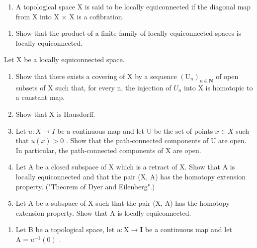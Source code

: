 \begin{enumerate}
\def\labelenumi{\arabic{enumi})}
\setcounter{enumi}{17}
\tightlist
\item
  A topological space X is said to be locally equiconnected if the diagonal map from X into X × X is a cofibration.
\end{enumerate}

\begin{enumerate}
\def\labelenumi{\alph{enumi})}
\tightlist
\item
  Show that the product of a finite family of locally equiconnected spaces is locally equiconnected.
\end{enumerate}

Let X be a locally equiconnected space.

\begin{enumerate}
\def\labelenumi{\alph{enumi})}
\setcounter{enumi}{1}
\item
  Show that there exists a covering of X by a sequence \((\mathrm{U}_{n})_{n\in\mathbf{N}}\) of open subsets of X such that, for every n, the injection of \(U_{n}\) into X is homotopic to a constant map.
\item
  Show that X is Hausdorff.
\item
  Let \(u: X \to I\) be a continuous map and let U be the set of points \(x \in X\) such that \(u(x) > 0\) . Show that the path-connected components of U are open. In particular, the path-connected components of X are open.
\item
  Let A be a closed subspace of X which is a retract of X. Show that A is locally equiconnected and that the pair (X, A) has the homotopy extension property. ("Theorem of Dyer and Eilenberg".)
\item
  Let A be a subspace of X such that the pair (X, A) has the homotopy extension property. Show that A is locally equiconnected.
\end{enumerate}

\begin{enumerate}
\def\labelenumi{\arabic{enumi})}
\setcounter{enumi}{18}
\tightlist
\item
  Let B be a topological space, let \(u \colon \mathrm{X} \to \mathbf{I}\) be a continuous map and let \(\mathrm{A} = u^{-1}(0)\) .
\end{enumerate}

